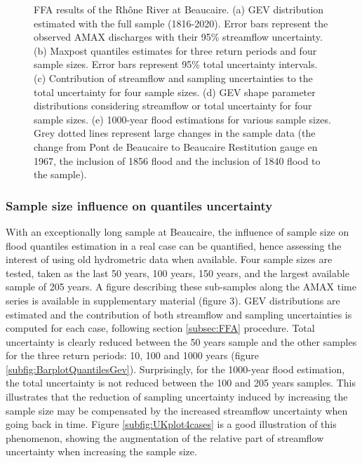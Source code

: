\begin{figure}[p]
            
        \caption{FFA results of the Rhône River at Beaucaire. (a) GEV distribution estimated with the full sample (1816-2020). Error bars represent the observed AMAX discharges with their 95\% streamflow uncertainty.
        (b) Maxpost quantiles estimates for three return periods and four sample sizes. Error bars represent 95\% total uncertainty intervals.
        (c) Contribution of streamflow and sampling uncertainties to the total uncertainty for four sample sizes. 
        (d) GEV shape parameter distributions considering streamflow or total uncertainty for four sample sizes. 
        (e) 1000-year flood estimations for various sample sizes. Grey dotted lines represent large changes in the sample data (the change from Pont de Beaucaire to Beaucaire Restitution gauge en 1967, the inclusion of 1856 flood and the inclusion of 1840 flood to the sample).}
        \label{fig:Quantiles}
        \end{figure}

        \subsubsection{Sample size influence on quantiles uncertainty}
        \label{subsec:SampleSize}
        
        With an exceptionally long sample at Beaucaire, the influence of sample size on flood quantiles estimation in a real case can be quantified, hence assessing the interest of using old hydrometric data when available. Four sample sizes are tested, taken as the last 50 years, 100 years, 150 years, and the largest available sample of 205 years. A figure describing these sub-samples along the AMAX time series is available in supplementary material (figure 3). GEV distributions are estimated and the contribution of both streamflow and sampling uncertainties is computed for each case, following section \ref{subsec:FFA} procedure. Total uncertainty is clearly reduced between the 50 years sample and the other samples for the three return periods: 10, 100 and 1000 years (figure \ref{subfig:BarplotQuantilesGev}). Surprisingly, for the 1000-year flood estimation, the total uncertainty is not reduced between the 100 and 205 years samples. This illustrates that the reduction of sampling uncertainty induced by increasing the sample size may be compensated by the increased streamflow uncertainty when going back in time. Figure \ref{subfig:UKplot4cases} is a good illustration of this phenomenon, showing the augmentation of the relative part of streamflow uncertainty when increasing the sample size.
        
